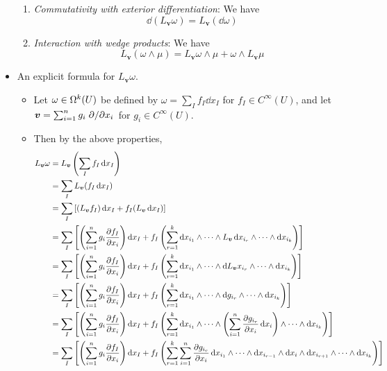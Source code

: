 \documentclass[../notes.tex]{subfiles}
\begin{document}
\begin{itemize}
\begin{enumerate}
        \item \emph{Commutativity with exterior differentiation}: We have
        \begin{equation*}
            \dd(L_{\bm{v}}\omega) = L_{\bm{v}}(\dd\omega)
        \end{equation*}
        \item \emph{Interaction with wedge products}: We have
        \begin{equation*}
            L_{\bm{v}}(\omega\wedge\mu) = L_{\bm{v}}\omega\wedge\mu+\omega\wedge L_{\bm{v}}\mu
        \end{equation*}
    \end{enumerate}
    \item An explicit formula for $L_{\bm{v}}\omega$.
    \begin{itemize}
        \item Let $\omega\in\ome[k]{U}$ be defined by $\omega=\sum_If_I\dd{x_I}$ for $f_I\in C^\infty(U)$, and let $\bm{v}=\sum_{i=1}^ng_i\pdv*{x_i}$ for $g_i\in C^\infty(U)$.
        \item Then by the above properties,
        \begin{align*}
            L_{\bm{v}}\omega &= L_{\bm{v}}\left( \sum_If_I\dd{x_I} \right)\\
            &= \sum_IL_{\bm{v}}(f_I\dd{x_I})\\
            &= \sum_I\left[ (L_{\bm{v}}f_I)\dd{x_I}+f_I(L_{\bm{v}}\dd{x_I}) \right]\\
            &= \sum_I\left[ \left( \sum_{i=1}^ng_i\pdv{f_I}{x_i} \right)\dd{x_I}+f_I\left( \sum_{r=1}^k\dd{x_{i_1}}\wedge\cdots\wedge L_{\bm{v}}\dd{x_{i_r}}\wedge\cdots\wedge\dd{x_{i_k}} \right) \right]\\
            &= \sum_I\left[ \left( \sum_{i=1}^ng_i\pdv{f_I}{x_i} \right)\dd{x_I}+f_I\left( \sum_{r=1}^k\dd{x_{i_1}}\wedge\cdots\wedge\dd L_{\bm{v}}x_{i_r}\wedge\cdots\wedge\dd{x_{i_k}} \right) \right]\\
            &= \sum_I\left[ \left( \sum_{i=1}^ng_i\pdv{f_I}{x_i} \right)\dd{x_I}+f_I\left( \sum_{r=1}^k\dd{x_{i_1}}\wedge\cdots\wedge\dd g_{i_r}\wedge\cdots\wedge\dd{x_{i_k}} \right) \right]\\
            &= \sum_I\left[ \left( \sum_{i=1}^ng_i\pdv{f_I}{x_i} \right)\dd{x_I}+f_I\left( \sum_{r=1}^k\dd{x_{i_1}}\wedge\cdots\wedge\left( \sum_{i=1}^n\pdv{g_{i_r}}{x_i}\dd{x_i} \right)\wedge\cdots\wedge\dd{x_{i_k}} \right) \right]\\
            &= \sum_I\left[ \left( \sum_{i=1}^ng_i\pdv{f_I}{x_i} \right)\dd{x_I}+f_I\left( \sum_{r=1}^k\sum_{i=1}^n\pdv{g_{i_r}}{x_i}\dd{x_{i_1}}\wedge\cdots\wedge\dd{x_{i_{r-1}}}\wedge\dd{x_i}\wedge\dd{x_{i_{r+1}}}\wedge\cdots\wedge\dd{x_{i_k}} \right) \right]\\

\end{align*}
\end{itemize}
\end{itemize}
\end{document}
